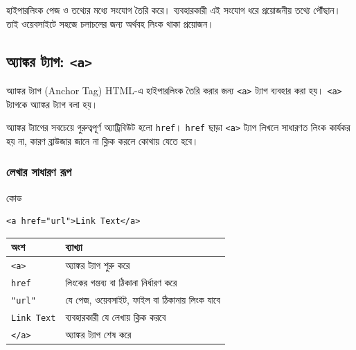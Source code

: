হাইপারলিংক পেজ ও তথ্যের মধ্যে সংযোগ তৈরি করে। ব্যবহারকারী এই সংযোগ ধরে প্রয়োজনীয় তথ্যে পৌঁছান। তাই ওয়েবসাইটে সহজে চলাচলের জন্য অর্থবহ লিংক থাকা প্রয়োজন।



\subsection{অ্যাঙ্কর ট্যাগ: \texttt{<a>}}

\begin{definitionbox}{অ্যাঙ্কর ট্যাগ (Anchor Tag)}
HTML-এ হাইপারলিংক তৈরি করার জন্য \texttt{<a>} ট্যাগ ব্যবহার করা হয়। \texttt{<a>} ট্যাগকে অ্যাঙ্কর ট্যাগ বলা হয়।
\end{definitionbox}

অ্যাঙ্কর ট্যাগের সবচেয়ে গুরুত্বপূর্ণ অ্যাট্রিবিউট হলো \texttt{href}। \texttt{href} ছাড়া \texttt{<a>} ট্যাগ লিখলে সাধারণত লিংক কার্যকর হয় না, কারণ ব্রাউজার জানে না ক্লিক করলে কোথায় যেতে হবে।

\subsubsection{লেখার সাধারণ রূপ}

\begin{examplebox}{কোড}
\par\noindent\begin{minipage}{\linewidth}
\begin{verbatim}
<a href="url">Link Text</a>
\end{verbatim}
\end{minipage}\par
\end{examplebox}

\begin{center}
\begin{tabular}{|p{}|p{}|}
\hline
\textbf{অংশ} & \textbf{ব্যাখ্যা} \\
\hline
\texttt{<a>} & অ্যাঙ্কর ট্যাগ শুরু করে \\
\hline
\texttt{href} & লিংকের গন্তব্য বা ঠিকানা নির্ধারণ করে \\
\hline
\texttt{"url"} & যে পেজ, ওয়েবসাইট, ফাইল বা ঠিকানায় লিংক যাবে \\
\hline
\texttt{Link Text} & ব্যবহারকারী যে লেখায় ক্লিক করবে \\
\hline
\texttt{</a>} & অ্যাঙ্কর ট্যাগ শেষ করে \\
\hline
\end{tabular}
\end{center}

